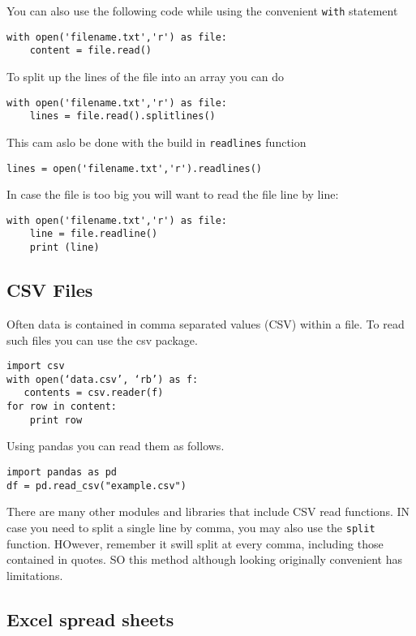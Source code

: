 You can also use the following code while using the convenient
\verb|with| statement

\begin{verbatim}
with open('filename.txt','r') as file:
    content = file.read()
\end{verbatim}

To split up the lines of the file into an array you can do

\begin{verbatim}
with open('filename.txt','r') as file:
    lines = file.read().splitlines()
\end{verbatim}


This cam aslo be done with the build in \verb|readlines| function
\begin{verbatim}
lines = open('filename.txt','r').readlines()
\end{verbatim}

In case the file is too big you will want to read the file line by
line:

\begin{verbatim}
with open('filename.txt','r') as file:
    line = file.readline()
    print (line)
\end{verbatim}


\subsection{CSV Files}

Often data is contained in comma separated values (CSV) within a
file. To read such files you can use the csv package.

\begin{verbatim}
import csv
with open(‘data.csv’, ‘rb’) as f:
   contents = csv.reader(f)
for row in content:
    print row
\end{verbatim}

Using pandas you can read them as follows.

\begin{verbatim}
import pandas as pd
df = pd.read_csv("example.csv") 
\end{verbatim}

There are many other modules and libraries that include CSV read
functions. IN case you need to split a single line by comma, you may
also use the \verb|split| function. HOwever, remember it swill split
at every comma, including those contained in quotes. SO this method
although looking originally convenient has limitations.

\subsection{Excel spread sheets}

